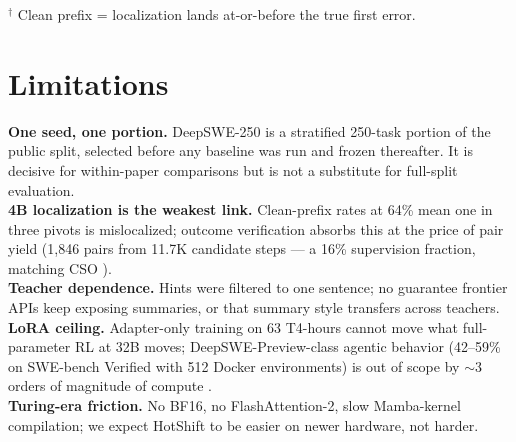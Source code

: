\documentclass[conference]{IEEEtran}
\begin{document}
\begin{table}[htbp]
\caption{Stage-2 Variants on DeepSWE-250}
\centering
{}
\label{tab:hint}
\end{table}
$^\dagger$ Clean prefix = localization lands at-or-before the true first error.

\section{Limitations}
\label{sec:limitations}
\textbf{One seed, one portion.} DeepSWE-250 is a stratified 250-task portion of the public split, selected before any baseline was run and frozen thereafter. It is decisive for within-paper comparisons but is not a substitute for full-split evaluation.\\
\textbf{4B localization is the weakest link.} Clean-prefix rates at 64\% mean one in three pivots is mislocalized; outcome verification absorbs this at the price of pair yield (1,846 pairs from 11.7K candidate steps --- a 16\% supervision fraction, matching CSO \cite{cso}).\\
\textbf{Teacher dependence.} Hints were filtered to one sentence; no guarantee frontier APIs keep exposing summaries, or that summary style transfers across teachers.\\
\textbf{LoRA ceiling.} Adapter-only training on 63 T4-hours cannot move what full-parameter RL at 32B moves; DeepSWE-Preview-class agentic behavior (42--59\% on SWE-bench Verified with 512 Docker environments) is out of scope by $\sim$3 orders of magnitude of compute \cite{deepswe_preview}.\\
\textbf{Turing-era friction.} No BF16, no FlashAttention-2, slow Mamba-kernel compilation; we expect HotShift to be easier on newer hardware, not harder.
\end{document}
